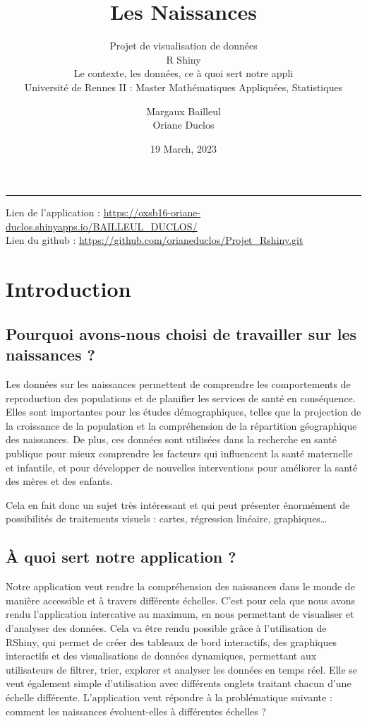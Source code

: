 \documentclass[
]{article}
\title{Les Naissances}
\subtitle{Projet de visualisation de données\\
R Shiny\\
Le contexte, les données, ce à quoi sert notre appli\\
Université de Rennes II : Master Mathématiques Appliquées, Statistiques}
\author{Margaux Bailleul\\
Oriane Duclos}
\date{19 March, 2023}
\begin{document}
\maketitle

{
\setcounter{tocdepth}{2}
\tableofcontents
}
\begin{center}\rule{0.5\linewidth}{0.5pt}\end{center}

Lien de l'application :
\url{https://oxsb16-oriane-duclos.shinyapps.io/BAILLEUL_DUCLOS/}\\
Lien du github : \url{https://github.com/orianeduclos/Projet_Rshiny.git}

\hypertarget{introduction}{%
\section{Introduction}\label{introduction}}

\hypertarget{pourquoi-avons-nous-choisi-de-travailler-sur-les-naissances}{%
\subsection{Pourquoi avons-nous choisi de travailler sur les naissances
?}\label{pourquoi-avons-nous-choisi-de-travailler-sur-les-naissances}}

Les données sur les naissances permettent de comprendre les
comportements de reproduction des populations et de planifier les
services de santé en conséquence. Elles sont importantes pour les études
démographiques, telles que la projection de la croissance de la
population et la compréhension de la répartition géographique des
naissances. De plus, ces données sont utilisées dans la recherche en
santé publique pour mieux comprendre les facteurs qui influencent la
santé maternelle et infantile, et pour développer de nouvelles
interventions pour améliorer la santé des mères et des enfants.

Cela en fait donc un sujet très intéressant et qui peut présenter
énormément de possibilités de traitements visuels : cartes, régression
linéaire, graphiques\ldots{}

\hypertarget{uxe0-quoi-sert-notre-application}{%
\subsection{À quoi sert notre application
?}\label{uxe0-quoi-sert-notre-application}}

Notre application veut rendre la compréhension des naissances dans le
monde de manière accessible et à travers différents échelles. C'est pour
cela que nous avons rendu l'application intercative au maximum, en nous
permettant de visualiser et d'analyser des données. Cela va être rendu
possible grâce à l'utilisation de RShiny, qui permet de créer des
tableaux de bord interactifs, des graphiques interactifs et des
visualisations de données dynamiques, permettant aux utilisateurs de
filtrer, trier, explorer et analyser les données en temps réel. Elle se
veut également simple d'utilisation avec différents onglets traitant
chacun d'une échelle différente. L'application veut répondre à la
problématique suivante : comment les naissances évoluent-elles à
différentes échelles ?
\end{document}
